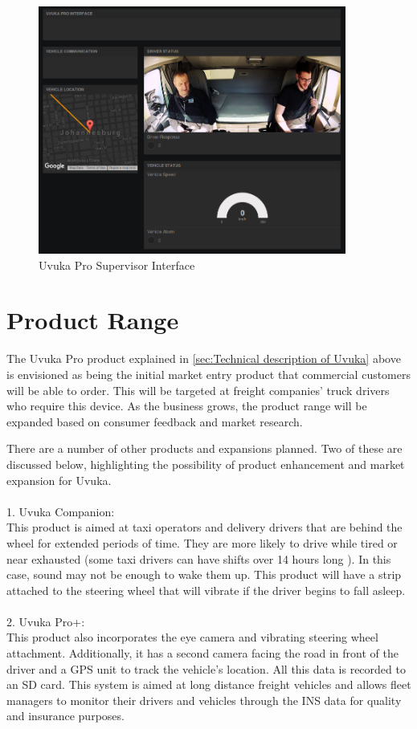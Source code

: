 \begin{figure}[H]
\centering
\includegraphics[width=0.9\textwidth]{images/uvuka-interface.png}
\vskip10pt
\caption[Uvuka Interface]{Uvuka Pro Supervisor Interface}
\label{fig:UvukaInterface}
\end{figure}

\newpage
\section{Product Range}
The Uvuka Pro product explained in \cref{sec:Technical description of Uvuka} above is envisioned as being the initial market entry product that commercial customers will be able to order. This will be targeted at freight companies' truck drivers who require this device. As the business grows, the product range will be expanded based on consumer feedback and market research.

There are a number of other products and expansions planned. Two of these are discussed below, highlighting the possibility of product enhancement and market expansion for Uvuka.\\
\\1. Uvuka Companion: \\This product is aimed at taxi operators and delivery drivers that are behind the wheel for extended periods of time. They are more likely to drive while tired or near exhausted (some taxi drivers can have shifts over 14 hours long \cite{taxiDriverHours}). In this case, sound may not be enough to wake them up. This product will have a strip attached to the steering wheel that will vibrate if the driver begins to fall asleep.\\
\\2. Uvuka Pro+: \\This product also incorporates the eye camera and vibrating steering wheel attachment. Additionally, it has a second camera facing the road in front of the driver and a GPS unit to track the vehicle's location. All this data is recorded to an SD card. This system is aimed at long distance freight vehicles and allows fleet managers to monitor their drivers and vehicles through the INS data for quality and insurance purposes.

